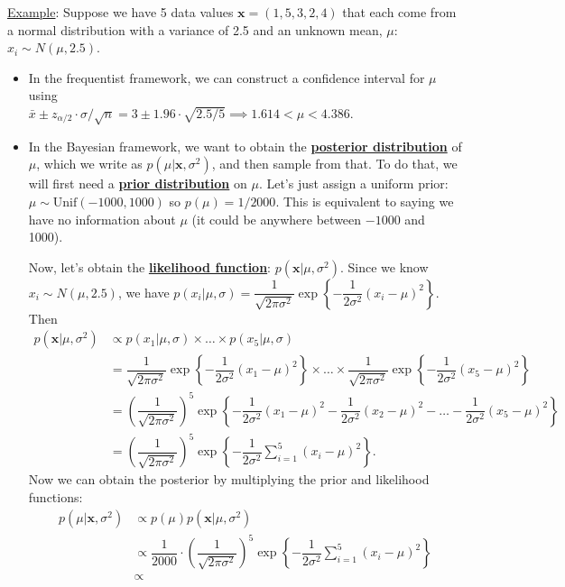 \documentclass[11pt]{article}
\newcommand{\ub}[1]{{\bf \uline{#1}}}
\begin{document}
\newpage 

\uline{Example}: Suppose we have 5 data values $\boldsymbol{x}=(1,5,3,2,4)$ that each come from a normal distribution with a variance of 2.5 and an unknown mean, $\mu$: $x_i\sim N(\mu,2.5)$.

\begin{itemize}
\item In the frequentist framework, we can construct a confidence interval for $\mu$ using\\
$\bar{x}\pm z_{\alpha/2}\cdot \sigma/\sqrt{n}=3\pm1.96\cdot \sqrt{2.5/5}\implies 1.614<\mu<4.386$.

\item In the Bayesian framework, we want to obtain the \ub{posterior distribution} of $\mu$, which we write as $p(\mu|\boldsymbol{x},\sigma^2)$, and then sample from that. To do that, we will first need a \ub{prior distribution} on $\mu$. Let's just assign a uniform prior: $\mu\sim \text{Unif}(-1000,1000)$ so $p(\mu)=1/2000$. This is equivalent to saying we have no information about $\mu$ (it could be anywhere between $-1000$ and 1000).

Now, let's obtain the \ub{likelihood function}: $p(\boldsymbol{x}|\mu,\sigma^2)$. Since we know $x_i\sim N(\mu,2.5)$, we have $p(x_i|\mu,\sigma)=\dfrac{1}{\sqrt{2\pi\sigma^2}}\exp\left\{-\dfrac{1}{2\sigma^2}(x_i-\mu)^2\right\}$. Then
\begin{align*}
p(\boldsymbol{x}|\mu,\sigma^2)&\propto p(x_1|\mu,\sigma)\times\dots\times p(x_5|\mu,\sigma)\\
&=\dfrac{1}{\sqrt{2\pi\sigma^2}}\exp\left\{-\dfrac{1}{2\sigma^2}(x_1-\mu)^2\right\}\times \dots\times \dfrac{1}{\sqrt{2\pi\sigma^2}}\exp\left\{-\dfrac{1}{2\sigma^2}(x_5-\mu)^2\right\}\\
&=\left(\dfrac{1}{\sqrt{2\pi\sigma^2}}\right)^5\exp\left\{-\dfrac{1}{2\sigma^2}(x_1-\mu)^2-\dfrac{1}{2\sigma^2}(x_2-\mu)^2-\dots-\dfrac{1}{2\sigma^2}(x_5-\mu)^2\right\}\\
&=\left(\dfrac{1}{\sqrt{2\pi\sigma^2}}\right)^5\exp\left\{-\dfrac{1}{2\sigma^2}\sum_{i=1}^5(x_i-\mu)^2\right\}.
\end{align*}
Now we can obtain the posterior by multiplying the prior and likelihood functions:
\begin{align*}
p(\mu|\boldsymbol{x},\sigma^2)&\propto p(\mu)p(\boldsymbol{x}|\mu,\sigma^2)\\
&\propto\dfrac{1}{2000}\cdot \left(\dfrac{1}{\sqrt{2\pi\sigma^2}}\right)^5\exp\left\{-\dfrac{1}{2\sigma^2}\sum_{i=1}^5(x_i-\mu)^2\right\}\\
&\propto
\end{align*}


\end{itemize}
\end{document}
